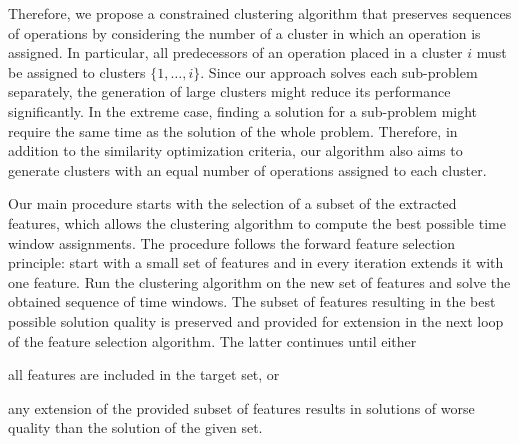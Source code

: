 \documentclass[runningheads]{llncs}
\begin{document}
Therefore, we propose a constrained clustering algorithm that preserves sequences of operations by considering the number of a cluster in which an operation is assigned. In particular, all predecessors of an operation placed in a cluster $i$ must be assigned to clusters $\{1, \dots, i\}$. 
Since our approach solves each sub-problem separately, the generation of large clusters might reduce its performance significantly. In the extreme case, finding a solution for a sub-problem might require the same time as the solution of the whole problem.
Therefore, in addition to the similarity optimization criteria, our algorithm also aims to generate clusters with an equal number of operations assigned to each cluster.  

Our main procedure starts with the selection of a subset of the extracted features, which allows the clustering algorithm to compute the best possible time window assignments. 
The procedure follows the forward feature selection principle: start with a small set of features and in every iteration extends it with one feature.
Run the clustering algorithm on the new set of features and solve the obtained sequence of time windows. The subset of features resulting in the best possible solution quality is preserved and provided for extension in the next loop of the feature selection algorithm. The latter continues until either 
\begin{enumerate*}[label=\emph{(\roman*)}]
  \item all features are included in the target set, or 
  \item any extension of the provided subset of features results in solutions of worse quality than the solution of the given set.
\end{enumerate*}
 
%
\end{document}

